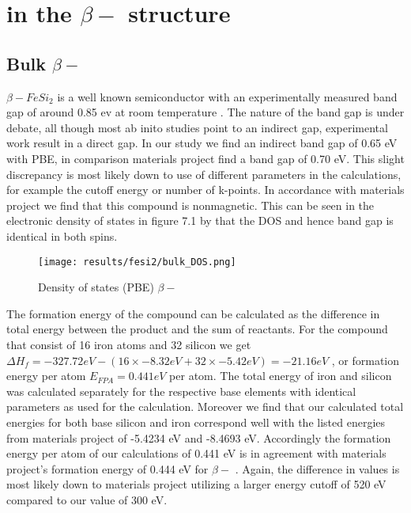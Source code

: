 \chapter{ in the $\beta-$ structure}
\label{sec:equi}

\section{Bulk $\beta-$ }
$\beta-FeSi_2$ is a well known semiconductor with an experimentally measured band gap of around 0.85 ev at room temperature \cite{PhysRevB.58.10389}. The nature of the band gap is under debate, all though most ab inito studies point to an indirect gap, experimental work result in a direct gap. In our study we find an indirect band gap of 0.65 eV with PBE, in comparison materials project find a band gap of 0.70 eV. This slight discrepancy is most likely down to use of different parameters in the calculations, for example the cutoff energy or number of k-points. In accordance with materials project we find that this compound is nonmagnetic. This can be seen in the electronic density of states in figure 7.1 by that the DOS and hence band gap is identical in both spins.   

\begin{figure}[H]
\centering
\texttt{[image: results/fesi2/bulk\_DOS.png]}
\caption{Density of states (PBE) $\beta-$ }
\end{figure}

The formation energy of the compound can be calculated as the difference in total energy between the product and the sum of reactants. For the  compound that consist of 16 iron atoms and 32 silicon we get $\Delta H_f = -327.72 eV - (16 \times -8.32 eV + 32 \times -5.42 eV) = -21.16 eV$ , or formation energy per atom $E_{FPA} = 0.441 eV$ per atom. The total energy of iron and silicon was calculated separately for the respective base elements with identical parameters as used for the  calculation. Moreover we find that our calculated total energies for both base silicon and iron correspond well with the listed energies from materials project of -5.4234 eV and -8.4693 eV. Accordingly the formation energy per atom of our calculations of 0.441 eV is in agreement with materials project's formation energy of 0.444 eV for $\beta-$ . Again, the difference in values is most likely down to materials project utilizing a larger energy cutoff of 520 eV compared to our value of 300 eV. 

